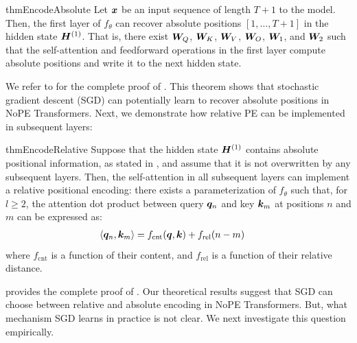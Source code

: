 \documentclass{article}
\begin{document}
\begin{mdframed}[style=MyFrame2]
  \begin{restatable}{thm}{EncodeAbsolute}
    \label{thm:encode_absolute}
    Let ${\bm{x}}$ be an input sequence of length $T+1$ to the model.
    Then, the first layer of $f_\theta$ can recover absolute positions $[1, \ldots, T+1]$ in the hidden state ${\bm{H}}^{(1)}$.
    That is, there exist ${\bm{W}}_Q$, ${\bm{W}}_K$, ${\bm{W}}_V$, ${\bm{W}}_O$, ${\bm{W}}_1$, and ${\bm{W}}_2$ such that the self-attention and feedforward operations in the first layer compute absolute positions and write it to the next hidden state.
  \end{restatable}
\end{mdframed}

We refer to  for the complete proof of .
This theorem shows that stochastic gradient descent (SGD) can potentially learn to recover absolute positions in NoPE Transformers. Next, we demonstrate how relative PE can be implemented in subsequent layers:

\begin{mdframed}[style=MyFrame2]
  \begin{restatable}{thm}{EncodeRelative}
    \label{thm:encode_relative}
    Suppose that the hidden state ${\bm{H}}^{(1)}$ contains absolute positional information, as stated in , and assume that it is not overwritten by any subsequent layers.
    Then, the self-attention in all subsequent layers can implement a relative positional encoding:
    there exists a parameterization of $f_\theta$ such that, for $l\ge 2$, the attention dot product between query ${\bm{q}}_n$ and key ${\bm{k}}_m$ at positions $n$ and $m$ can be expressed as:
    \begin{equation}
      \begin{aligned}
        \langle {\bm{q}}_n, {\bm{k}}_m \rangle & = f_\mathrm{cnt}({\bm{q}}, {\bm{k}}) + f_\mathrm{rel}(n-m) \
      \end{aligned}
    \end{equation}
    where $f_\mathrm{cnt}$ is a function of their content, and $f_\mathrm{rel}$ is a function of their relative distance.
  \end{restatable}
\end{mdframed}

 provides the complete proof of .
Our theoretical results suggest that SGD can choose between relative and absolute encoding in NoPE Transformers. But, what mechanism SGD learns in practice is not clear. We next investigate this question empirically.
\end{document}
